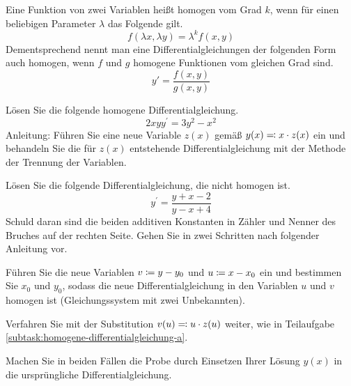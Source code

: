 \begin{atiTask}[
	topic = Gewöhnliche Differentialgleichungen,
	subtopic = Separable Differentialgleichungen,
	title = Homogene Differentialgleichungen,
	language = Deutsch
]
	Eine Funktion von zwei Variablen heißt homogen vom Grad $k$, wenn für einen beliebigen Parameter $\lambda$ das Folgende gilt.
	\[
		f(\lambda x, \lambda y) = \lambda^k f(x,y)
	\]
	Dementsprechend nennt man eine Differentialgleichungen der folgenden Form auch homogen, wenn $f$ und $g$ homogene Funktionen vom gleichen Grad sind.
	\[
		y' = \frac{f(x,y)}{g(x,y)}
	\]

	\begin{atiSubtasks}
		\item \label{subtask:homogene-differentialgleichung-a}
		Lösen Sie die folgende homogene Differentialgleichung.
		\[
			2xyy^\prime = 3y^2 - x^2
		\]
		Anleitung: Führen Sie eine neue Variable $z(x)$ gemäß $y(x)\eqqcolon x\cdot z(x)$ ein und behandeln Sie die für $z(x)$ entstehende Differentialgleichung mit der Methode der Trennung der Variablen.

		\item
		Lösen Sie die folgende Differentialgleichung, die nicht homogen ist.
		\[
			y^\prime = \frac{y+x-2}{y-x+4}
		\]
		Schuld daran sind die beiden additiven Konstanten in Zähler und Nenner des Bruches auf der rechten Seite.
		Gehen Sie in zwei Schritten nach folgender Anleitung vor.
		\begin{atiItems}
			\item Führen Sie die neue Variablen $v\coloneqq y-y_0$ und $u\coloneqq x-x_0$ ein und bestimmen Sie $x_0$ und $y_0$, sodass die neue Differentialgleichung in den Variablen $u$ und $v$ homogen ist (Gleichungssystem mit zwei Unbekannten).

			\item Verfahren Sie mit der Substitution $v(u)\eqqcolon u\cdot z(u)$ weiter, wie in Teilaufgabe \ref{subtask:homogene-differentialgleichung-a}.
		\end{atiItems}

		\item
		Machen Sie in beiden Fällen die Probe durch Einsetzen Ihrer Lösung $y(x)$ in die ursprüngliche Differentialgleichung.
	\end{atiSubtasks}
\end{atiTask}

